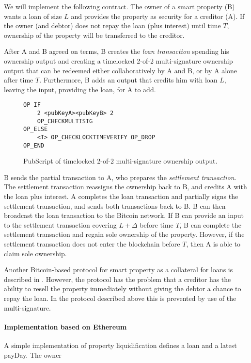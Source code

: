 We will implement the following contract. The owner of a smart property (B) wants a loan of size $L$ and provides the property as security for a creditor (A). If the owner (and debtor) does not repay the loan (plus interest) until time $T$, ownership of the property will be transferred to the creditor.

After A and B agreed on terms, B creates the \emph{loan transaction} spending his ownership output and creating a timelocked 2-of-2 multi-signature ownership output that can be redeemed either collaboratively by A and B, or by A alone after time $T$. Furthermore, B adds an output that credits him with loan $L$, leaving the input, providing the loan, for A to add. 
\begin{figure}
\begin{lstlisting}
OP_IF 
    2 <pubKeyA><pubKeyB> 2
    OP_CHECKMULTISIG
OP_ELSE
    <T> OP_CHECKLOCKTIMEVERIFY OP_DROP
OP_END    
\end{lstlisting}
\caption{PubScript of timelocked 2-of-2 multi-signature ownership output.}
\end{figure}

B sends the partial transaction to A, who prepares the \emph{settlement transaction}. The settlement transaction reassigns the ownership back to B, and credits A with the loan plus interest. A completes the loan transaction and partially signs the settlement transaction, and sends both transactions back to B. B can then broadcast the loan transaction to the Bitcoin network. 
If B can provide an input to the settlement transaction covering $L+\Delta$ before time $T$, B can complete the settlement transaction and regain sole ownership of the property. However, if the settlement transaction does not enter the blockchain before $T$, then A is able to claim sole ownership.

Another Bitcoin-based protocol for smart property as a collateral for loans is described in \cite{smartproperty2011}. However, the protocol has the problem that a creditor has the ability to resell the property immediately without giving the debtor a chance to repay the loan. In the protocol described above this is prevented by use of the multi-signature. 

\paragraph{Implementation based on Ethereum}

A simple implementation of property liquidification defines a loan and a latest payDay. The owner  

